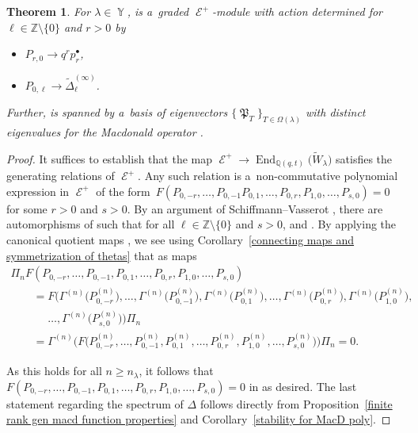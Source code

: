\documentclass[10pt,a4paper]{amsart}
\numberwithin{equation}{section}
\newtheorem{Theorem}{Theorem}[section]
\theoremstyle{definition}
\DeclareMathOperator{\Par}{\mathbb{Y}}
\DeclareMathOperator{\sD}{\mathscr{D}}
\DeclareMathOperator{\MacD}{\mathfrak{P}}
\DeclareMathOperator{\sE}{\mathcal{E}}
\DeclareMathOperator{\End}{\mathrm{End}}
\begin{document}
\begin{Theorem} \label{positive EHA module}
 For $\lambda \in \Par$,  is a~graded $\sE^{+}$-module with action determined for $\ell \in \mathbb{Z}\setminus \{0\}$ and $r>0$ by
 \begin{itemize}
\itemsep=0pt
 \item $P_{r,0} \rightarrow q^{r} p_{r}^{\bullet}$,
 \item $P_{0,\ell} \rightarrow \widetilde{\Delta}_{\ell}^{(\infty)}$.
 \end{itemize}
 Further,  is spanned by a~basis of eigenvectors $\{ \MacD_{T}\}_{T \in \Omega(\lambda)}$ with distinct eigenvalues for the Macdonald operator .
\end{Theorem}
\begin{proof}
It suffices to establish that the map $\sE^{+} \rightarrow \End_{\mathbb{Q}(q,t)}\bigl(\widetilde{W}_{\lambda}\bigr)$ satisfies the generating relations of $\sE^{+}$. Any such relation is a~non-commutative polynomial expression in $\sE^{+}$ of the form~${ F(P_{0,-r},\dots, P_{0,-1}P_{0,1},\dots,P_{0,r},P_{1,0},\dots,P_{s,0}) = 0}
$
for some $r > 0$ and $s>0$. By an argument of Schiffmann--Vasserot \cite[Lemma 1.3]{SV}, there are automorphisms  of \smash{$\sD_n^{\mathrm{sph}}$} such that for all $\ell \in \mathbb{Z}\setminus \{0\}$ and $s>0$,
 and . By applying the canonical quotient maps , we see using Corollary~\ref{connecting maps and symmetrization of thetas} that as maps
\begin{gather*}
\Pi_nF(P_{0,-r},\dots, P_{0,-1},P_{0,1},\dots,P_{0,r},P_{1,0},\dots,P_{s,0}) \\
\qquad=F\bigl(\Gamma^{(n)}\bigl(P^{(n)}_{0,-r}\bigr),\dots,\Gamma^{(n)}\bigl(P^{(n)}_{0,-1}\bigr),\Gamma^{(n)}\bigl(P^{(n)}_{0,1}\bigr), \dots, \Gamma^{(n)}\bigl(P^{(n)}_{0,r}\bigr),\Gamma^{(n)}\bigl(P^{(n)}_{1,0}\bigr),\\
\phantom{\qquad=}{}\dots,\Gamma^{(n)}\bigl(P^{(n)}_{s,0}\bigr)\bigr)\Pi_n \\
\qquad= \Gamma^{(n)}\bigl(F\bigl(P^{(n)}_{0,-r},\dots, P^{(n)}_{0,-1},P^{(n)}_{0,1},\dots,P^{(n)}_{0,r},P^{(n)}_{1,0},\dots,P^{(n)}_{s,0}\bigr)\bigr) \Pi_n = 0.
\end{gather*}

As this holds for all $n \geq n_{\lambda}$, it follows that $F(P_{0,-r},\dots, P_{0,-1},P_{0,1},\dots,P_{0,r},P_{1,0},\dots,P_{s,0}) = 0$ in \smash{$\End_{\mathbb{Q}(q,t)}\bigl(\widetilde{W}_{\lambda}\bigr)$} as desired. The last statement regarding the spectrum of $\Delta$ follows directly from Proposition~\ref{finite rank gen macd function properties} and Corollary~\ref{stability for MacD poly}.
\end{proof}
\end{document}
